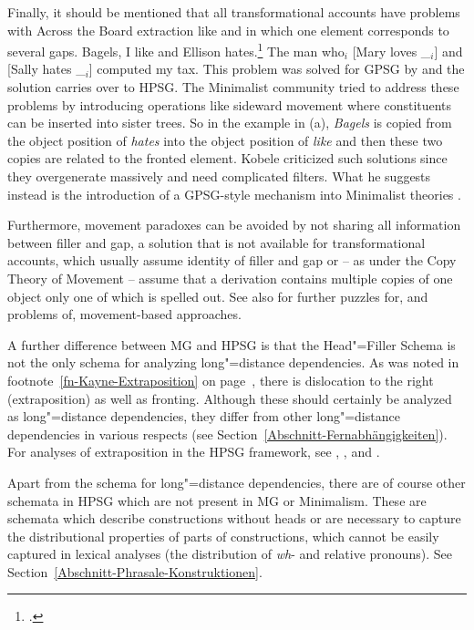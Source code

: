 Finally, it should be mentioned that all transformational accounts have problems with Across the
Board extraction like  and  in which one element corresponds to several gaps.
\eal
\label{ex-atb-minimalism}
\ex\label{ex-bagels-i-like-and-ellison-hates}
Bagels, I like and Ellison hates.\footnote{%
  .
}
\ex The man who$_i$ [Mary loves \_$_i$] and [Sally hates \_$_i$] computed my tax.
\zl
This problem was solved for GPSG by \citet{Gazdar81} and the solution carries over to HPSG. The
Minimalist community tried to address these problems by introducing operations like sideward
movement \citep{Nunes2004a-u} where constituents can be inserted into sister trees. So in the
example in (a), \emph{Bagels} is copied from the object position of \emph{hates} into the
object position of \emph{like} and then these two copies are related to the fronted element. Kobele
criticized such solutions since they overgenerate massively and need complicated filters. What he
suggests instead is the introduction of a GPSG-style \slasch mechanism into Minimalist theories \citep{Kobele2008a}.

Furthermore,
movement paradoxes \citep[Chapter~2]{Bresnan2001a} can be avoided by not sharing all information between filler and gap, a solution
that is not available for transformational accounts, which usually assume identity of filler and gap
or -- as under the Copy Theory of Movement -- assume that a derivation contains multiple copies of one
object only one of which is spelled out. See also  for further puzzles for, and
problems of, movement-based approaches.


A further difference between MG and HPSG is that the Head"=Filler Schema is not the only schema for analyzing
long"=distance dependencies. As was noted in footnote~\ref{fn-Kayne-Extraposition} on 
page~\pageref{fn-Kayne-Extraposition}, there is dislocation to the right (extraposition) as well
as fronting. Although these should certainly be analyzed as long"=distance dependencies, they differ from other
long"=distance dependencies in various respects (see Section~\ref{Abschnitt-Fernabhängigkeiten}). For analyses of
extraposition in the HPSG framework, see , , and 
. 

Apart from the schema for long"=distance dependencies, there are of course other schemata in HPSG which are not
present in MG or Minimalism. These are schemata which describe constructions without heads or are necessary to
capture the distributional properties of parts of constructions, which cannot be easily captured in lexical analyses
(\eg the distribution of \emph{wh}- and relative pronouns). See Section~\ref{Abschnitt-Phrasale-Konstruktionen}.  

